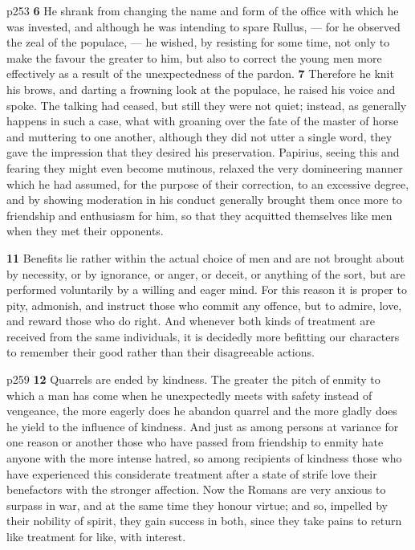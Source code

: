 p253
\textbf{6} He shrank from changing the name and form of the office with which he was invested, and although he was intending to spare Rullus, \texthebrew{—} for he observed the zeal of the populace, \texthebrew{—} he wished, by resisting for some time, not only to make the favour the greater to him, but also to correct the young men more effectively as a result of the unexpectedness of the pardon. \textbf{7} Therefore he knit his brows, and darting a frowning look at the populace, he raised his voice and spoke. The talking had ceased, but still they were not quiet; instead, as generally happens in such a case, what with groaning over the fate of the master of horse and muttering to one another, although they did not utter a single word, they gave the impression that they desired his preservation. Papirius, seeing this and fearing they might even become mutinous, relaxed the very domineering manner which he had assumed, for the purpose of their correction, to an excessive degree, and by showing moderation in his conduct generally brought them once more to friendship and enthusiasm for him, so that they acquitted themselves like men when they met their opponents.

\textbf{11} Benefits lie rather within the actual choice of men and are not brought about by necessity, or by ignorance, or anger, or deceit, or anything of the sort, but are performed voluntarily by a willing and eager mind. For this reason it is proper to pity, admonish, and instruct those who commit any offence, but to admire, love, and reward those who do right. And whenever both kinds of treatment are received from the same individuals, it is decidedly more befitting our characters to remember their good rather than their disagreeable actions.

p259
\textbf{12} Quarrels are ended by kindness. The greater the pitch of enmity to which a man has come when he unexpectedly meets with safety instead of vengeance, the more eagerly does he abandon quarrel and the more gladly does he yield to the influence of kindness. And just as among persons at variance for one reason or another those who have passed from friendship to enmity hate anyone with the more intense hatred, so among recipients of kindness those who have experienced this considerate treatment after a state of strife love their benefactors with the stronger affection. Now the Romans are very anxious to surpass in war, and at the same time they honour virtue; and so, impelled by their nobility of spirit, they gain success in both, since they take pains to return like treatment for like, with interest.

